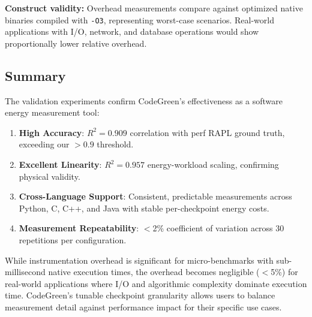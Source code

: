 \textbf{Construct validity:} Overhead measurements compare against optimized native binaries compiled with \texttt{-O3}, representing worst-case scenarios. Real-world applications with I/O, network, and database operations would show proportionally lower relative overhead.

\subsection{Summary}

The validation experiments confirm CodeGreen's effectiveness as a software energy measurement tool:

\begin{enumerate}
    \item \textbf{High Accuracy}: $R^2 = 0.909$ correlation with perf RAPL ground truth, exceeding our $>0.9$ threshold.
    \item \textbf{Excellent Linearity}: $R^2 = 0.957$ energy-workload scaling, confirming physical validity.
    \item \textbf{Cross-Language Support}: Consistent, predictable measurements across Python, C, C++, and Java with stable per-checkpoint energy costs.
    \item \textbf{Measurement Repeatability}: $<$2\% coefficient of variation across 30 repetitions per configuration.
\end{enumerate}

While instrumentation overhead is significant for micro-benchmarks with sub-millisecond native execution times, the overhead becomes negligible ($<$5\%) for real-world applications where I/O and algorithmic complexity dominate execution time. CodeGreen's tunable checkpoint granularity allows users to balance measurement detail against performance impact for their specific use cases.
